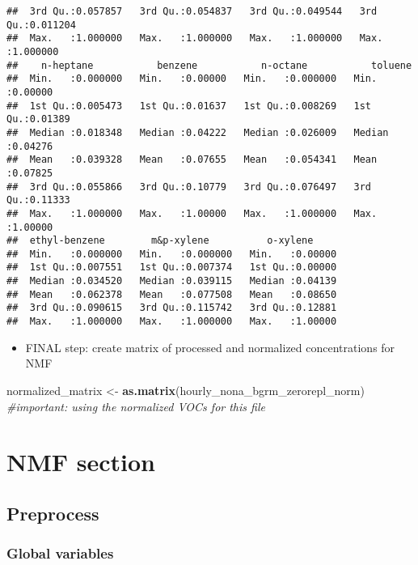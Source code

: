 \documentclass[
]{article}
\newenvironment{Shaded}{\begin{snugshade}}{\end{snugshade}}
\newcommand{\CommentTok}[1]{\textcolor[rgb]{0.56,0.35,0.01}{\textit{#1}}}
\newcommand{\FunctionTok}[1]{\textcolor[rgb]{0.13,0.29,0.53}{\textbf{#1}}}
\newcommand{\NormalTok}[1]{#1}
\newcommand{\OtherTok}[1]{\textcolor[rgb]{0.56,0.35,0.01}{#1}}
\providecommand{\tightlist}{%
  \setlength{\itemsep}{0pt}\setlength{\parskip}{0pt}}
\begin{document}
\begin{verbatim}
##  3rd Qu.:0.057857   3rd Qu.:0.054837   3rd Qu.:0.049544   3rd Qu.:0.011204  
##  Max.   :1.000000   Max.   :1.000000   Max.   :1.000000   Max.   :1.000000  
##    n-heptane           benzene           n-octane           toluene       
##  Min.   :0.000000   Min.   :0.00000   Min.   :0.000000   Min.   :0.00000  
##  1st Qu.:0.005473   1st Qu.:0.01637   1st Qu.:0.008269   1st Qu.:0.01389  
##  Median :0.018348   Median :0.04222   Median :0.026009   Median :0.04276  
##  Mean   :0.039328   Mean   :0.07655   Mean   :0.054341   Mean   :0.07825  
##  3rd Qu.:0.055866   3rd Qu.:0.10779   3rd Qu.:0.076497   3rd Qu.:0.11333  
##  Max.   :1.000000   Max.   :1.00000   Max.   :1.000000   Max.   :1.00000  
##  ethyl-benzene        m&p-xylene          o-xylene      
##  Min.   :0.000000   Min.   :0.000000   Min.   :0.00000  
##  1st Qu.:0.007551   1st Qu.:0.007374   1st Qu.:0.00000  
##  Median :0.034520   Median :0.039115   Median :0.04139  
##  Mean   :0.062378   Mean   :0.077508   Mean   :0.08650  
##  3rd Qu.:0.090615   3rd Qu.:0.115742   3rd Qu.:0.12881  
##  Max.   :1.000000   Max.   :1.000000   Max.   :1.00000
\end{verbatim}

\begin{itemize}
\tightlist
\item
  FINAL step: create matrix of processed and normalized concentrations
  for NMF
\end{itemize}

\begin{Shaded}
\begin{Highlighting}[]
\NormalTok{normalized\_matrix }\OtherTok{\textless{}{-}} \FunctionTok{as.matrix}\NormalTok{(hourly\_nona\_bgrm\_zerorepl\_norm)}
\CommentTok{\#important: using the normalized VOCs for this file}
\end{Highlighting}
\end{Shaded}

\section{NMF section}\label{nmf-section}

\subsection{Preprocess}\label{preprocess}

\subsubsection{Global variables}\label{global-variables}
\end{document}
